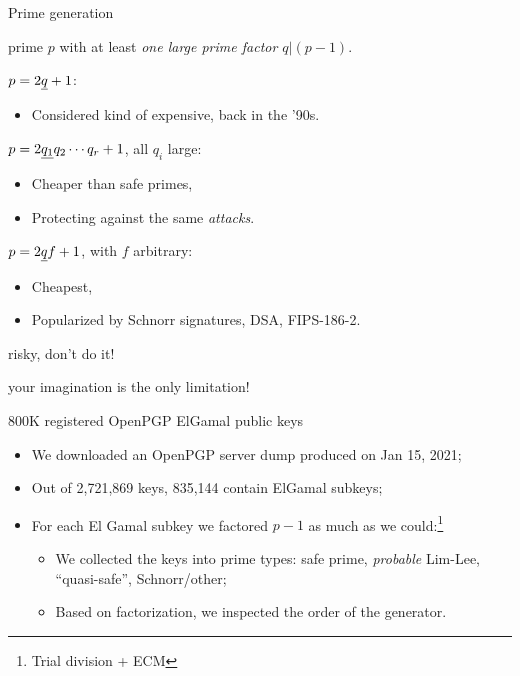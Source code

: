 \documentclass[aspectratio=169]{beamer}
\begin{document}
\begin{frame}{Prime generation}
  \begin{description}[labelwidth=0,leftmargin=!]
    \setlength{\itemsep}{1em}
  \item[Goal:] prime $p$ with at least \emph{one large prime factor $q|(p-1)$}.
  \item[Safe primes:] $p = 2\emph{q} + 1$:
    \begin{itemize}
    \item Considered kind of expensive, back in the '90s.
    \end{itemize}
  \item[``Lim-Lee'' primes:] $p = 2\emph{q_1}q_2\cdots q_r + 1$, all $q_i$ large:
    \begin{itemize}
    \item Cheaper than safe primes,
    \item Protecting against the same \emph{attacks}.
    \end{itemize}
  \item[``Schnorr'' primes:] $p = 2\emph{q}f + 1$, with $f$ arbitrary:
    \begin{itemize}
    \item Cheapest,
    \item Popularized by Schnorr signatures, DSA, FIPS-186-2.
    \end{itemize}
  \item[Random primes:] risky, don't do it!
  \item[Other:] your imagination is the only limitation!
  \end{description}
\end{frame}


\begin{frame}{800K registered OpenPGP ElGamal public keys}
  \large
  \begin{itemize}
    \setlength{\itemsep}{1.5ex}
  \item We downloaded an OpenPGP server dump produced on Jan 15, 2021;
  \item Out of 2,721,869 keys, 835,144 contain ElGamal subkeys;
  \item For each El Gamal subkey we factored $p-1$ as much as we
    could:\footnote{Trial division + ECM}
    \begin{itemize}
      \normalsize
    \item We collected the keys into prime types: safe prime,
      \textit{probable} Lim-Lee, ``quasi-safe'', Schnorr/other;
    \item Based on factorization, we inspected the order of the
      generator.
    \end{itemize}
  \end{itemize}
\end{frame}
\end{document}
